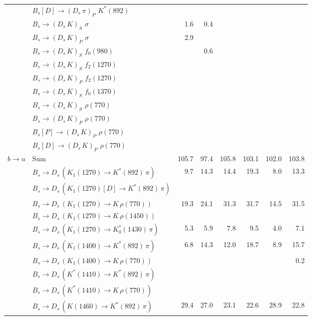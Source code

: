 \begin{tabular}{l l  r  r  r  r  r  r  }
 & $B_s[D] \to ( D_s \, \pi)_{P} \, \, K^{*}(892)$ &  &  &  &  &  &  \\ 
 & $B_s \to ( D_s \, K)_{S} \, \, \sigma$ & 1.6 & 0.4 &  &  &  &  \\ 
 & $B_s \to ( D_s \, K)_{P} \, \, \sigma$ & 2.9 &  &  &  &  &  \\ 
 & $B_s \to ( D_s \, K)_{S} \, \, f_0(980)$ &  & 0.6 &  &  &  &  \\ 
 & $B_s \to ( D_s \, K)_{S} \, \, f_2(1270)$ &  &  &  &  &  &  \\ 
 & $B_s \to ( D_s \, K)_{P} \, \, f_2(1270)$ &  &  &  &  &  &  \\ 
 & $B_s \to ( D_s \, K)_{S} \, \, f_0(1370)$ &  &  &  &  &  &  \\ 
 & $B_s \to ( D_s \, K)_{S} \, \, \rho(770)$ &  &  &  &  &  &  \\ 
 & $B_s \to ( D_s \, K)_{P} \, \, \rho(770)$ &  &  &  &  &  &  \\ 
 & $B_s[P] \to ( D_s \, K)_{P} \, \, \rho(770)$ &  &  &  &  &  &  \\ 
 & $B_s[D] \to ( D_s \, K)_{P} \, \, \rho(770)$ &  &  &  &  &  &  \\ 
\multirow{30}{*}{$b \to u$}  & $\text{Sum}$ & 105.7 & 97.4 & 105.8 & 103.1 & 102.0 & 103.8 \\ 
\hline
 & $B_s \to D_s \, ( K_1(1270) \to K^{*}(892) \, \pi )$ & 9.7 & 14.3 & 14.4 & 19.3 & 8.0 & 13.3 \\ 
 & $B_s \to D_s \, ( K_1(1270)[D] \to K^{*}(892) \, \pi )$ &  &  &  &  &  &  \\ 
 & $B_s \to D_s \, ( K_1(1270) \to K \, \rho(770) )$ & 19.3 & 24.1 & 31.3 & 31.7 & 14.5 & 31.5 \\ 
 & $B_s \to D_s \, ( K_1(1270) \to K \, \rho(1450) )$ &  &  &  &  &  &  \\ 
 & $B_s \to D_s \, ( K_1(1270) \to K^{*}_{0}(1430) \, \pi )$ & 5.3 & 5.9 & 7.8 & 9.5 & 4.0 & 7.1 \\ 
 & $B_s \to D_s \, ( K_1(1400) \to K^{*}(892) \, \pi )$ & 6.8 & 14.3 & 12.0 & 18.7 & 8.9 & 15.7 \\ 
 & $B_s \to D_s \, ( K_1(1400) \to K \, \rho(770) )$ &  &  &  &  &  & 0.2 \\ 
 & $B_s \to D_s \, ( K^{*}(1410) \to K^{*}(892) \, \pi )$ &  &  &  &  &  &  \\ 
 & $B_s \to D_s \, ( K^{*}(1410) \to K \, \rho(770) )$ &  &  &  &  &  &  \\ 
 & $B_s \to D_s \, ( K(1460) \to K^{*}(892) \, \pi )$ & 29.4 & 27.0 & 23.1 & 22.6 & 28.9 & 22.8 \\ 

\end{tabular}
